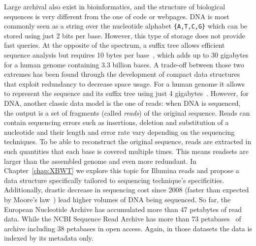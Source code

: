 Large archival also exist in bioinformatics, and the structure of biological sequences is very different from the one of code or webpages. DNA is most commonly seen as a string over the nucleotide alphabet \texttt{\{A,T,C,G\}} which can be stored using just 2 bits per base. However, this type of storage does not provide fast queries. At the opposite of the spectrum, a suffix tree allows efficient sequence analysis but requires 10 bytes per base~\cite{navarro2016compact}, which adds up to 30 gigabytes for a human genome containing 3.3 billion bases. A trade-off between those two extremes has been found through the development of compact data structures that exploit redundancy to decrease space usage. For a human genome it allows to represent the sequence and its suffix tree using just 4 gigabytes~\cite{navarro2016compact}.\sloppy
However, for DNA, another classic data model is the one of reads: when DNA is sequenced, the output is a set of fragments (called \emph{reads}) of the original sequence. Reads can contain sequencing errors such as insertions, deletion and substitution of a nucleotide and their length and error rate vary depending on the sequencing techniques. To be able to reconstruct the original sequence, reads are extracted in such quantities that each base is covered multiple times. This means readsets are larger than the assembled genome and even more redundant. In Chapter~\ref{chap:XBWT} we explore this topic for Illumina reads and propose a data structure specifically tailored to sequencing technique's specificities. 
Additionally, drastic decrease in sequencing cost since 2008 (faster than expected by Moore's law~\cite{muir2016real}) lead higher volumes of DNA being sequenced. 
So far, the European Nucleotide Archive has accumulated more than 47 petabytes\cite{ena} of read data.
While the NCBI Sequence Read Archive has more than 73 petabases~\cite{sra} of archive including 38 petabases in open access. Again, in those datasets the data is indexed by its metadata only.\\


